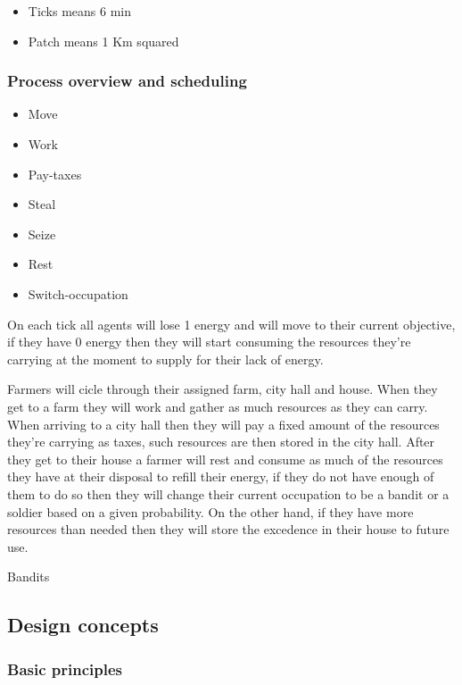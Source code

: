 \documentclass{wscpaperproc}
\theoremstyle{wsc}
\begin{document}
\begin{itemize}
    \item Ticks means 6 min
    \item Patch means 1 Km squared
\end{itemize}

\subsubsection{Process overview and scheduling}

\begin{itemize}
    \item Move
    \item Work
    \item Pay-taxes
    \item Steal
    \item Seize
    \item Rest
    \item Switch-occupation
\end{itemize}

On each tick all agents will lose 1 energy and will move to their current objective, if they have 0
energy then they will start consuming the resources they're carrying at the moment to supply for
their lack of energy.

Farmers will cicle through their assigned farm, city hall and house.
When they get to a farm they will work and gather as much resources as they can carry.
When arriving to a city hall then they will pay a fixed amount of the resources they're carrying as
taxes, such resources are then stored in the city hall.
After they get to their house a farmer will rest and consume as much of the resources they have at
their disposal to refill their energy, if they do not have enough of them to do so then they will
change their current occupation to be a bandit or a soldier based on a given probability. On the
other hand, if they have more resources than needed then they will store the excedence in their house
to future use.

Bandits

\subsection{Design concepts}

\subsubsection{Basic principles}
\end{document}
